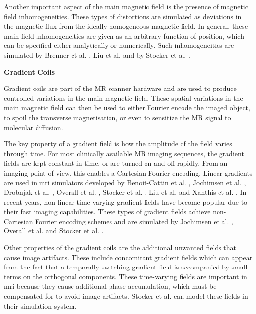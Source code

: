 \hfill

Another important aspect of the main magnetic field is the presence of magnetic field inhomogeneities.
These types of distortions are simulated as deviations in the magnetic flux from the ideally homogeneous magnetic field.
In general, these main-field inhomogeneities are given as an arbitrary function of position, which can be specified either analytically or numerically.
Such inhomogeneities are simulated by 
Brenner et al. \cite{Brenner1997}, 
Liu et al. \cite{Liu2013} and by
Stocker et al. \cite{Stocker2010}.

\hfill

\large \textbf{Gradient Coils} \normalsize

Gradient coils are part of the MR scanner hardware and are used to produce controlled variations in the main magnetic field.
These spatial variations in the main magnetic field can then be used 
to either Fourier encode the imaged object, 
to spoil the transverse magnetisation, or even
to sensitize the MR signal to molecular diffusion.

\hfill
    
The key property of a gradient field is how the amplitude of the field varies through time.
For most clinically available MR imaging sequences, the gradient fields are kept constant in time, or are turned on and off rapidly.
From an imaging point of view, this enables a Cartesian Fourier encoding.
Linear gradients are used in \ac{mri} simulators developed by
Benoit-Cattin et al. \cite{Benoit-Cattin2005},
Jochimsen et al. \cite{Jochimsen2004},
Drobnjak et al. \cite{Drobnjak2006},
Overall et al. \cite{Overall2007},
Stocker et al. \cite{Stocker2010},
Liu et al. \cite{Liu2013} and 
Xanthis et al. \cite{Xanthis2014}.
In recent years, non-linear time-varying gradient fields have become popular due to their fast imaging capabilities.
These types of gradient fields achieve non-Cartesian Fourier encoding schemes and are simulated by 
Jochimsen et al. \cite{Jochimsen2004}, 
Overall et al. \cite{Overall2007} and
Stocker et al. \cite{Stocker2010}.

\hfill

Other properties of the gradient coils are the additional unwanted fields that cause image artifacts.
These include concomitant gradient fields which can appear from the fact that a temporally switching gradient field is accompanied by small terms on the orthogonal components.
These time-varying fields are important in \ac{mri} because they cause additional phase accumulation, which must be compensated for to avoid image artifacts.
Stocker et al. \cite{Stocker2010} can model these fields in their simulation system.


